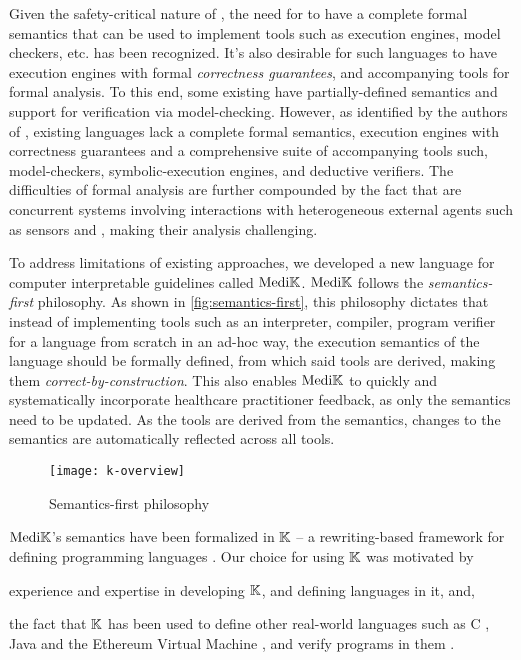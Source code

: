 Given the safety-critical nature of \CDSSs{}, the need for \CIG{} \DSLs{} to
have a complete formal semantics that can be used to implement tools such as
execution engines, model checkers, etc. has been recognized.
It's also desirable for such languages to have execution engines with formal \emph{correctness
guarantees}, and accompanying tools for formal analysis.
To this end, some existing \DSLs{} have partially-defined semantics and
support for verification via model-checking.
However, as identified by the authors of \cite{SuttonAMIA03, ShaharAMIA96},
existing languages lack a complete formal semantics,
execution engines with correctness guarantees
and a comprehensive suite of accompanying tools such, model-checkers, symbolic-execution
engines, and deductive verifiers.
The difficulties of formal analysis are further compounded
by the fact that \CDSSs{} are concurrent systems involving interactions with
heterogeneous external agents such as sensors and \HCPs{}, making their analysis challenging.

To address limitations of existing approaches, we developed a new language
for computer interpretable guidelines called $\text{Medi}\mathbb{K}{}$. $\text{Medi}\mathbb{K}{}$ follows
the \emph{semantics-first} philosophy. As shown in \autoref{fig:semantics-first}, this philosophy dictates that instead of
implementing tools such as an interpreter,
compiler, program verifier for a language from scratch in an ad-hoc way,
the execution semantics of the language should be formally defined, from which
said tools are derived, making them \emph{correct-by-construction}.
This also enables $\text{Medi}\mathbb{K}{}$ to quickly and
systematically incorporate healthcare practitioner feedback, as only the
semantics need to be updated. As the tools are derived from the semantics,
changes to the semantics are automatically reflected across all tools.

\begin{figure}[t!]
  \centering
  \texttt{[image: k-overview]}
  \caption{Semantics-first philosophy}\label{fig:semantics-first}
\end{figure}


$\text{Medi}\mathbb{K}{}{}$'s semantics have been formalized in $\mathbb{K}$ -- a rewriting-based
framework for defining programming languages \cite{KframeworkUrl}. Our
choice for using $\mathbb{K}$ was motivated by
\begin{enumerate*}[label=(\alph*)]
  \item experience and expertise in developing $\mathbb{K}$, and defining languages in
    it, and,
  \item the fact that $\mathbb{K}$ has been used to define other real-world languages such as C
    \cite{HathhornPLDI15}, Java \cite{BogdanasPOPL15} and the Ethereum Virtual
    Machine \cite{HildenbrandtCSF18}, and verify programs in them
    \cite{ParkFSE18,StefanescuOOPSLA16}.
\end{enumerate*}

